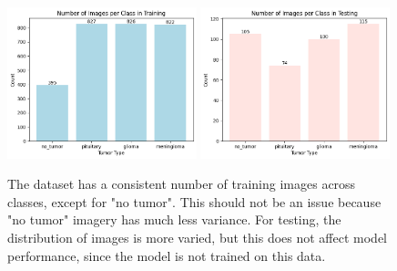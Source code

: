 \documentclass[conference]{IEEEtran}
\begin{document}




\begin{figure}[!ht]
    \centering
    \includegraphics[width=0.49\textwidth]{ImagesPerClassTraining.png}
    \hfill
    \includegraphics[width=0.49\textwidth]{ImagesPerClassTesting.png}
    \caption{\large The dataset has a consistent number of training images across classes, except for "no tumor". This should not be an issue because "no tumor" imagery has much less variance. For testing, the distribution of images is more varied, but this does not affect model performance, since the model is not trained on this data.}
    \label{fig:images-per-class}
\end{figure}
\end{document}

